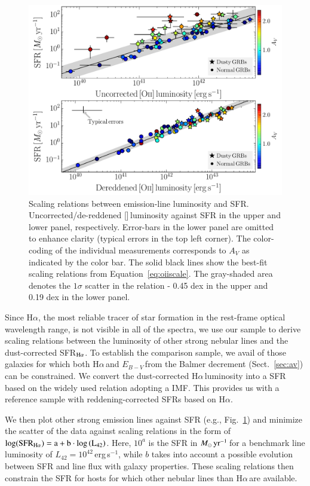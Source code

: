 \documentclass[traditabstract, longauth]{aa}
\newcommand{\ha}{H$\alpha$}
\newcommand{\ebv}{$E_{B-V}\,$}
\newcommand{\oii}{[\ion{O}{ii}]}
\newcommand{\Msunyr}{$M_\odot\,\rm{yr}^{-1}$}
\begin{document}
\begin{figure}
\includegraphics[angle=0, width=0.99\columnwidth]{Figs/Ha_OII.pdf}
\caption{Scaling relations between emission-line luminosity and SFR. Uncorrected/de-reddened \oii\,luminosity against SFR in the upper and lower panel, respectively. Error-bars in the lower panel are omitted to enhance clarity (typical errors in the top left corner). The color-coding of the individual measurements corresponds to $A_V$ as indicated by the color bar. The solid black lines show the best-fit scaling relations from Equation~\ref{eq:oiiscale}. The gray-shaded area denotes the $1\sigma$ scatter in the relation - 0.45 dex in the upper and 0.19 dex in the lower panel.}
\label{fig:haoii}
\end{figure}

Since \ha, the most reliable tracer of star formation in the rest-frame optical wavelength range, is not visible in all of the spectra, we use our sample to derive scaling relations between the luminosity of other strong nebular lines and the dust-corrected SFR$_{\rm{H}\alpha}$. To establish the comparison sample, we avail of those galaxies for which both \ha\,and \ebv from the Balmer decrement (Sect.~\ref{sec:av}) can be constrained. We convert the dust-corrected \ha\,luminosity into a SFR based on the widely used \citet{1998ARA&A..36..189K} relation adopting a \citet{2003PASP..115..763C} IMF. This provides us with a reference sample with reddening-corrected SFRs based on \ha.

We then plot other strong emission lines against SFR (e.g., Fig.~\ref{fig:haoii}) and minimize the scatter of the data against scaling relations in the form of $\log(\rm{SFR_{H\alpha}}) = a + b\cdot\log\left(L_{42}\right)$. Here, $10^{a}$ is the SFR in \Msunyr\,for a benchmark line luminosity of $L_{42}=10^{42}$\,erg\,{s}$^{-1}$, while $b$ takes into account a possible evolution between SFR and line flux with galaxy properties. These scaling relations then constrain the SFR for hosts for which other nebular lines than \ha\,are available.
\end{document}
